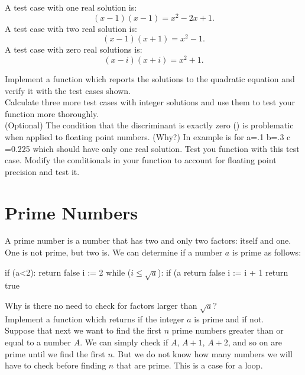 {A test case with one real solution is:
\begin{displaymath}
(x-1)(x-1)= x^2 -2x + 1.
\end{displaymath}
A test case with two real solution is:
\begin{displaymath}
(x-1)(x+1)= x^2 - 1.
\end{displaymath}
A test case with zero real solutions is:
\begin{displaymath}
(x-i)(x+i)= x^2 + 1.
\end{displaymath}

\vskip 0.25cm
\plot Implement a function  which reports the solutions to the quadratic equation and verify it with the test cases shown.\\

\vskip 0.25cm
\plot Calculate three more test cases with integer solutions and use them to test your function more thoroughly. \\

\vskip 0.25cm
\plot (Optional) The condition that the discriminant is exactly zero
() is problematic when applied to floating point
numbers. (Why?) In example is for a=.1 b=.3 c =0.225 which should have
only one real solution.  Test you function with this test case.
Modify the conditionals in your function to account for floating point
precision and test it.\\

\section{Prime Numbers}

A prime number is a number that has two and only two factors: itself
and one.  One is not prime, but two is.  We can determine if a number
$a$ is prime as follows:
\vskip 0.25cm
\begin{algorithm}
  if (a<2):
     return false
  i := 2
  while ($i \leq \sqrt{a}$):   
     if (a%
        return false
     i := i + 1
  return true
\end{algorithm}
\vskip 0.25cm
Why is there no need to check for factors larger than $\sqrt{a}$?\\

\plot Implement a function  which returns 
if the integer $a$ is prime and  if not.\\

Suppose that next we want to find the first $n$ prime numbers greater
than or equal to a number $A$.  We can simply check if $A$, $A+1$,
$A+2$, and so on are prime until we find the first $n$.  But we do not
know how many numbers we will have to check before finding $n$ that
are prime.  This is a case for a  loop.\\

}
